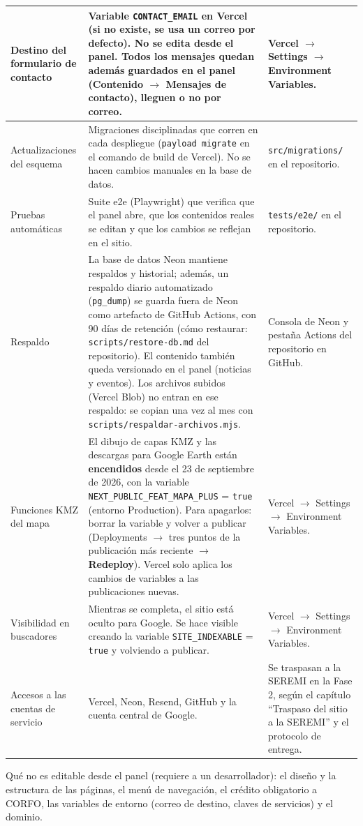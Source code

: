 \documentclass[11pt,letterpaper]{report}
\begin{document}
\begin{longtable}{>{\raggedright\arraybackslash}p{}>{\raggedright\arraybackslash}p{}>{\raggedright\arraybackslash}p{}}
\rowcolor{filaalt}Destino del formulario de contacto & Variable \texttt{CONTACT\_\allowbreak{}EMAIL} en Vercel (si no existe, se usa un correo por defecto). \textbf{No se edita desde el panel.} Todos los mensajes quedan además guardados en el panel (Contenido $\rightarrow$ Mensajes de contacto), lleguen o no por correo. & Vercel $\rightarrow$ Settings $\rightarrow$ Environment Variables. \\ \midrule
Actualizaciones del esquema & Migraciones disciplinadas que corren en cada despliegue (\texttt{payload migrate} en el comando de build de Vercel). No se hacen cambios manuales en la base de datos. & \texttt{src/migrations/} en el repositorio. \\ \midrule
\rowcolor{filaalt}Pruebas automáticas & Suite e2e (Playwright) que verifica que el panel abre, que los contenidos reales se editan y que los cambios se reflejan en el sitio. & \texttt{tests/e2e/} en el repositorio. \\ \midrule
Respaldo & La base de datos Neon mantiene respaldos y historial; además, un respaldo diario automatizado (\texttt{pg\_\allowbreak{}dump}) se guarda fuera de Neon como artefacto de GitHub Actions, con 90 días de retención (cómo restaurar: \texttt{scripts/restore-db.md} del repositorio). El contenido también queda versionado en el panel (noticias y eventos). Los archivos subidos (Vercel Blob) no entran en ese respaldo: se copian una vez al mes con \texttt{scripts/respaldar-archivos.mjs}. & Consola de Neon y pestaña Actions del repositorio en GitHub. \\ \midrule
\rowcolor{filaalt}Funciones KMZ del mapa & El dibujo de capas KMZ y las descargas para Google Earth están \textbf{encendidos} desde el 23 de septiembre de 2026, con la variable \texttt{NEXT\_\allowbreak{}PUBLIC\_\allowbreak{}FEAT\_\allowbreak{}MAPA\_\allowbreak{}PLUS} = \texttt{true} (entorno Production). Para apagarlos: borrar la variable y volver a publicar (Deployments $\rightarrow$ tres puntos de la publicación más reciente $\rightarrow$ \textbf{Redeploy}). Vercel solo aplica los cambios de variables a las publicaciones nuevas. & Vercel $\rightarrow$ Settings $\rightarrow$ Environment Variables. \\ \midrule
Visibilidad en buscadores & Mientras se completa, el sitio está oculto para Google. Se hace visible creando la variable \texttt{SITE\_\allowbreak{}INDEXABLE} = \texttt{true} y volviendo a publicar. & Vercel $\rightarrow$ Settings $\rightarrow$ Environment Variables. \\ \midrule
\rowcolor{filaalt}Accesos a las cuentas de servicio & Vercel, Neon, Resend, GitHub y la cuenta central de Google. & Se traspasan a la SEREMI en la Fase 2, según el capítulo “Traspaso del sitio a la SEREMI” y el protocolo de entrega. \\ \bottomrule
\end{longtable}
Qué no es editable desde el panel (requiere a un desarrollador): el diseño y la estructura de las páginas, el menú de navegación, el crédito obligatorio a CORFO, las variables de entorno (correo de destino, claves de servicios) y el dominio.
\end{document}
